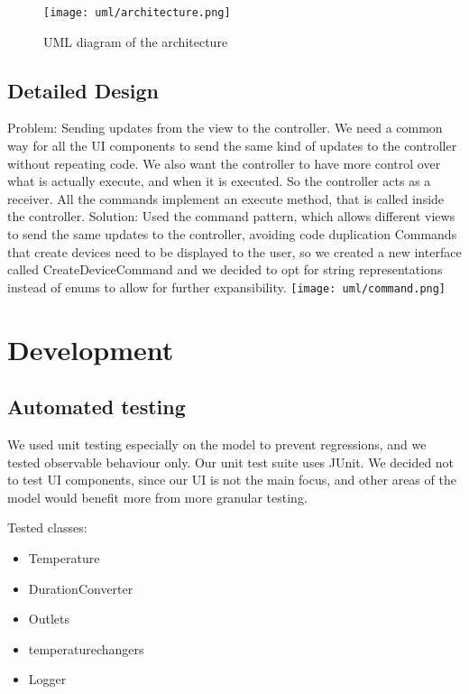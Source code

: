 \documentclass[a4paper,12pt]{report}
\begin{document}
\begin{figure}[H]
\centering{}
\texttt{[image: uml/architecture.png]}
\caption{UML diagram of the architecture}
\label{uml:architecture}
\end{figure}

\section{Detailed Design}
Problem: Sending updates from the view to the controller. 
We need a common way for all the UI components to send the same kind of updates to the controller without repeating code.
We also want the controller to have more control over what is actually execute, and when it is executed. So the controller acts as a receiver.
All the commands implement an execute method, that is called inside the controller.
Solution: Used the command pattern, which allows %
different views to send the same updates to the controller, avoiding code duplication
Commands that create devices need to be displayed to the user, so we created a new interface called CreateDeviceCommand
and we decided to opt for string representations instead of enums to allow for further expansibility.
\newline
\texttt{[image: uml/command.png]}






\chapter{Development}
\section{Automated testing}
We used unit testing especially on the model to prevent regressions, and we tested observable behaviour only.
Our unit test suite uses JUnit.
We decided not to test UI components, since our UI is not the main focus,
and other areas of the model would benefit more from more granular testing. 

Tested classes:
\begin{itemize}
	\item Temperature
	\item DurationConverter
	\item Outlets
	\item temperaturechangers
	\item Logger
\end{itemize}
\end{document}
